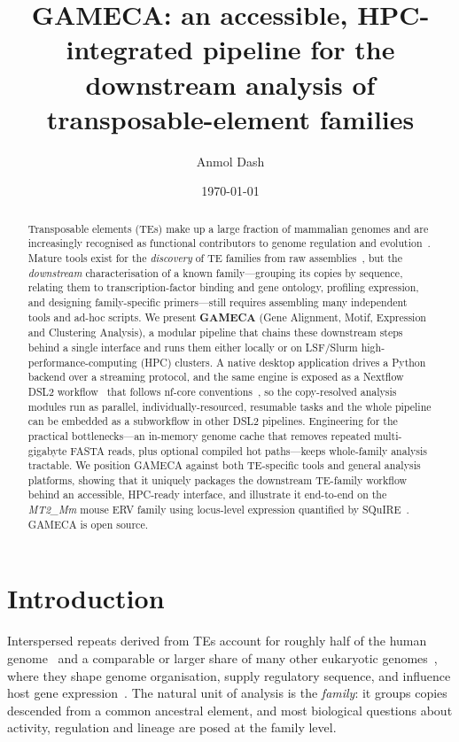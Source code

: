 \documentclass[11pt]{article}
\title{\textbf{GAMECA}: an accessible, HPC-integrated pipeline for the\\
downstream analysis of transposable-element families}
\author{Anmol Dash}
\date{\today}
\begin{document}
\maketitle

\begin{abstract}
\noindent
Transposable elements (TEs) make up a large fraction of mammalian genomes and are
increasingly recognised as functional contributors to genome regulation and
evolution~\citep{bourque2018}. Mature tools exist for the \emph{discovery} of TE families from
raw assemblies~\citep{flynn2020}, but the \emph{downstream} characterisation of a known
family---grouping its copies by sequence, relating them to transcription-factor binding and
gene ontology, profiling expression, and designing family-specific primers---still requires
assembling many independent tools and ad-hoc scripts. We present \textbf{GAMECA} (Gene
Alignment, Motif, Expression and Clustering Analysis), a modular pipeline that chains these
downstream steps behind a single interface and runs them either locally or on LSF/Slurm
high-performance-computing (HPC) clusters. A native desktop application drives a Python
backend over a streaming protocol, and the same engine is exposed as a Nextflow DSL2
workflow~\citep{ditommaso2017} that follows nf-core conventions~\citep{ewels2020}, so the
copy-resolved analysis modules run as parallel, individually-resourced, resumable tasks and
the whole pipeline can be embedded as a subworkflow in other DSL2 pipelines. Engineering for
the practical bottlenecks---an in-memory genome cache that removes repeated multi-gigabyte
FASTA reads, plus optional compiled hot paths---keeps whole-family analysis tractable. We
position GAMECA against both TE-specific
tools and general analysis platforms, showing that it uniquely packages the downstream
TE-family workflow behind an accessible, HPC-ready interface, and illustrate it end-to-end on
the \emph{MT2\_Mm} mouse ERV family using locus-level expression quantified by
SQuIRE~\citep{yang2019squire}. GAMECA is open source.
\end{abstract}

\section{Introduction}

Interspersed repeats derived from TEs account for roughly half of the human
genome~\citep{lander2001} and a comparable or larger share of many other eukaryotic
genomes~\citep{bourque2018}, where they shape genome organisation, supply regulatory sequence,
and influence host gene expression~\citep{wicker2007}. The natural unit of analysis is the
\emph{family}: it groups copies descended from a common ancestral element, and most biological
questions about activity, regulation and lineage are posed at the family level.
\end{document}
